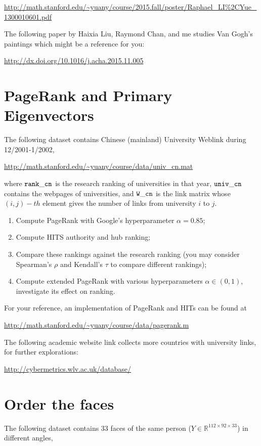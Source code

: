 \documentclass[11pt]{article}
\def\R{{\mathbb R}}
\begin{document}
\url{http://math.stanford.edu/~yuany/course/2015.fall/poster/Raphael_LI\%2CYue_1300010601.pdf}

The following paper by Haixia Liu, Raymond Chan, and me studies Van Gogh's paintings which might be a reference for you:

\url{http://dx.doi.org/10.1016/j.acha.2015.11.005}

\section{PageRank and Primary Eigenvectors}

The following dataset contains Chinese (mainland) University Weblink during 12/2001-1/2002,

\url{http://math.stanford.edu/~yuany/course/data/univ_cn.mat}

\noindent where $\tt{rank\_{}cn}$ is the research ranking of universities in that year, $\tt{univ\_{}cn}$ contains the webpages of universities, and $\tt{W\_{}cn}$ is the link matrix whose $(i,j)-th$ element gives the number of links from university
$i$ to $j$. 
 
\begin{enumerate}
\item Compute PageRank with Google's hyperparameter $\alpha=0.85$;
\item Compute HITS authority and hub ranking; 
\item Compare these rankings against the research ranking (you may consider Spearman's $\rho$ and Kendall's $\tau$ to compare different rankings);  
\item Compute extended PageRank with various hyperparameters $\alpha\in (0,1)$, investigate its effect on ranking. 
\end{enumerate} 

For your reference, an implementation of PageRank and HITs can be found at 

\url{http://math.stanford.edu/~yuany/course/data/pagerank.m}

The following academic website link collects more countries with university links, for further explorations:

\url{http://cybermetrics.wlv.ac.uk/database/} 

\section{Order the faces}
The following dataset contains 33 faces of the same person ($Y\in \R^{112\times 92\times33}$) in different angles,
\end{document}
